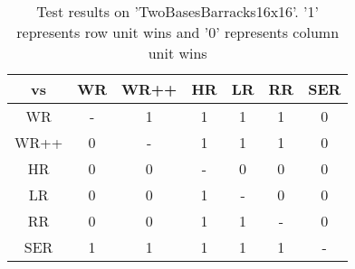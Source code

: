 \begin{table}[h]
    \centering
    \caption{Test results on 'TwoBasesBarracks16x16'. '1' represents row unit wins and '0' represents column unit wins}
    \label{table:TwoBasesBarracks16x16}
    \begin{tabular}{c|cccccc}
        \toprule
        vs & WR & WR++ & HR & LR & RR & SER \\
        \midrule
        WR      & - & 1 & 1 & 1 & 1 & 0 \\
        WR++    & 0 & - & 1 & 1 & 1 & 0 \\
        HR      & 0 & 0 & - & 0 & 0 & 0 \\
        LR      & 0 & 0 & 1 & - & 0 & 0 \\
        RR      & 0 & 0 & 1 & 1 & - & 0 \\
        SER     & 1 & 1 & 1 & 1 & 1 & - \\
        \bottomrule
    \end{tabular}
\end{table}